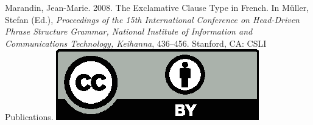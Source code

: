 \documentclass[11pt,a4paper,fleqn]{article}
\begin{document}
\noindent



\vfill
\noindent
Marandin, Jean-Marie. 2008. The Exclamative Clause Type in French. In Müller, Stefan (Ed.), \emph{{Proceedings of the 15th International Conference on Head-Driven Phrase Structure Grammar, National Institute of Information and Communications Technology, Keihanna}}, 436--456. Stanford,
CA: CSLI Publications. \hfill\href{http://creativecommons.org/licenses/by/4.0/}{\includegraphics[height=.75em]{Includes/ccby.eps}}

\newpage

\end{document}
